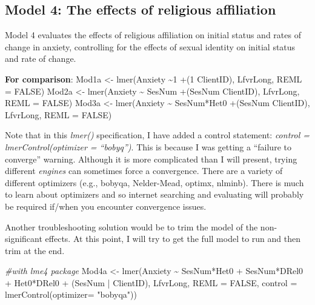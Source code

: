 \documentclass[
  english,
]{book}
\newenvironment{Shaded}{\begin{snugshade}}{\end{snugshade}}
\newcommand{\AttributeTok}[1]{\textcolor[rgb]{0.77,0.63,0.00}{#1}}
\newcommand{\CommentTok}[1]{\textcolor[rgb]{0.56,0.35,0.01}{\textit{#1}}}
\newcommand{\ConstantTok}[1]{\textcolor[rgb]{0.00,0.00,0.00}{#1}}
\newcommand{\FunctionTok}[1]{\textcolor[rgb]{0.00,0.00,0.00}{#1}}
\newcommand{\NormalTok}[1]{#1}
\newcommand{\OtherTok}[1]{\textcolor[rgb]{0.56,0.35,0.01}{#1}}
\newcommand{\SpecialCharTok}[1]{\textcolor[rgb]{0.00,0.00,0.00}{#1}}
\newcommand{\StringTok}[1]{\textcolor[rgb]{0.31,0.60,0.02}{#1}}
\begin{document}
\hypertarget{model-4-the-effects-of-religious-affiliation}{%
\subsection{Model 4: The effects of religious affiliation}\label{model-4-the-effects-of-religious-affiliation}}

Model 4 evaluates the effects of religious affiliation on initial status and rates of change in anxiety, controlling for the effects of sexual identity on initial status and rate of change.

\textbf{For comparison}:
Mod1a \textless- lmer(Anxiety \textasciitilde1 +(1 \textbar{} ClientID), LfvrLong, REML = FALSE)
Mod2a \textless- lmer(Anxiety \textasciitilde{} SesNum +(SesNum \textbar{} ClientID), LfvrLong, REML = FALSE)
Mod3a \textless- lmer(Anxiety \textasciitilde{} SesNum*Het0 +(SesNum \textbar{} ClientID), LfvrLong, REML = FALSE)

Note that in this \emph{lmer()} specification, I have added a control statement: \emph{control = lmerControl(optimizer = ``bobyq'')}. This is because I was getting a ``failure to converge'' warning. Although it is more complicated than I will present, trying different \emph{engines} can sometimes force a convergence. There are a variety of different optimizers (e.g., bobyqa, Nelder-Mead, optimx, nlminb). There is much to learn about optimizers and so internet searching and evaluating will probably be required if/when you encounter convergence issues.

Another troubleshooting solution would be to trim the model of the non-significant effects. At this point, I will try to get the full model to run and then trim at the end.

\begin{Shaded}
\begin{Highlighting}[]
\CommentTok{\#with lme4 package}
\NormalTok{Mod4a }\OtherTok{\textless{}{-}} \FunctionTok{lmer}\NormalTok{(Anxiety }\SpecialCharTok{\textasciitilde{}}\NormalTok{ SesNum}\SpecialCharTok{*}\NormalTok{Het0 }\SpecialCharTok{+}\NormalTok{ SesNum}\SpecialCharTok{*}\NormalTok{DRel0 }\SpecialCharTok{+}\NormalTok{ Het0}\SpecialCharTok{*}\NormalTok{DRel0 }\SpecialCharTok{+}\NormalTok{ (SesNum }\SpecialCharTok{|}\NormalTok{ ClientID), LfvrLong, }\AttributeTok{REML =} \ConstantTok{FALSE}\NormalTok{, }\AttributeTok{control =} \FunctionTok{lmerControl}\NormalTok{(}\AttributeTok{optimizer=} \StringTok{"bobyqa"}\NormalTok{))}
\end{Highlighting}
\end{Shaded}
\end{document}
